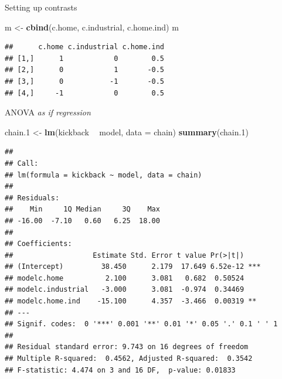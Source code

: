 \documentclass[ignorenonframetext,]{beamer}
\newenvironment{Shaded}{\begin{snugshade}}{\end{snugshade}}
\newcommand{\DataTypeTok}[1]{\textcolor[rgb]{0.13,0.29,0.53}{#1}}
\newcommand{\FloatTok}[1]{\textcolor[rgb]{0.00,0.00,0.81}{#1}}
\newcommand{\KeywordTok}[1]{\textcolor[rgb]{0.13,0.29,0.53}{\textbf{#1}}}
\newcommand{\NormalTok}[1]{#1}
\newcommand{\OperatorTok}[1]{\textcolor[rgb]{0.81,0.36,0.00}{\textbf{#1}}}
\newcommand{\StringTok}[1]{\textcolor[rgb]{0.31,0.60,0.02}{#1}}
\begin{document}
\begin{frame}[fragile]{Setting up contrasts}
\protect\hypertarget{setting-up-contrasts}{}

\begin{Shaded}
\begin{Highlighting}[]
\NormalTok{m <-}\StringTok{ }\KeywordTok{cbind}\NormalTok{(c.home, c.industrial, c.home.ind)}
\NormalTok{m}
\end{Highlighting}
\end{Shaded}

\begin{verbatim}
##      c.home c.industrial c.home.ind
## [1,]      1            0        0.5
## [2,]      0            1       -0.5
## [3,]      0           -1       -0.5
## [4,]     -1            0        0.5
\end{verbatim}

\begin{Shaded}
\end{Shaded}

\end{frame}

\begin{frame}[fragile]{ANOVA \emph{as if regression}}
\protect\hypertarget{anova-as-if-regression}{}

\scriptsize

\begin{Shaded}
\begin{Highlighting}[]
\NormalTok{chain}\FloatTok{.1}\NormalTok{ <-}\StringTok{ }\KeywordTok{lm}\NormalTok{(kickback }\OperatorTok{~}\StringTok{ }\NormalTok{model, }\DataTypeTok{data =}\NormalTok{ chain)}
\KeywordTok{summary}\NormalTok{(chain}\FloatTok{.1}\NormalTok{)}
\end{Highlighting}
\end{Shaded}

\begin{verbatim}
## 
## Call:
## lm(formula = kickback ~ model, data = chain)
## 
## Residuals:
##    Min     1Q Median     3Q    Max 
## -16.00  -7.10   0.60   6.25  18.00 
## 
## Coefficients:
##                   Estimate Std. Error t value Pr(>|t|)    
## (Intercept)         38.450      2.179  17.649 6.52e-12 ***
## modelc.home          2.100      3.081   0.682  0.50524    
## modelc.industrial   -3.000      3.081  -0.974  0.34469    
## modelc.home.ind    -15.100      4.357  -3.466  0.00319 ** 
## ---
## Signif. codes:  0 '***' 0.001 '**' 0.01 '*' 0.05 '.' 0.1 ' ' 1
## 
## Residual standard error: 9.743 on 16 degrees of freedom
## Multiple R-squared:  0.4562, Adjusted R-squared:  0.3542 
## F-statistic: 4.474 on 3 and 16 DF,  p-value: 0.01833
\end{verbatim}

\normalsize

\end{frame}
\end{document}
